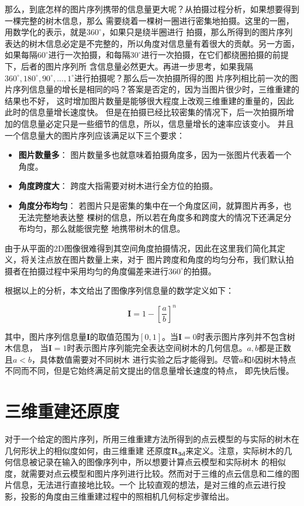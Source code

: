 那么，到底怎样的图片序列携带的信息量更大呢？从拍摄过程分析，如果想要得到一棵完整的树木信息，那么
需要绕着一棵树一圈进行密集地拍摄。这里的一圈，用数学化的表示，就是$360^\circ$，如果只是绕半圈进行
拍摄，那么所得到的图片序列表达的树木信息必定是不完整的，所以角度对信息量有着很大的贡献。另一方面，
如果每隔$60^\circ$进行一次拍摄，和每隔$30^\circ$进行一次拍摄，在它们都绕圈拍摄的前提下，后者的图片序列所
含信息量必然更大。再进一步思考，如果我隔$360^\circ,180^\circ,90^\circ,..., 1^\circ$进行拍摄呢？那么后一次拍摄所得的图
片序列相比前一次的图片序列信息量的增长是相同的吗？答案是否定的，因为当图片很少时，三维重建的结果也不好，
这时增加图片数量是能够很大程度上改观三维重建的重量的，因此此时的信息量增长速度快。
但是在拍摄已经比较密集的情况下，后一次拍摄所增加的信息量必定只是一些细节的信息，所以，信息量增长的速率应该变小。
并且一个信息量大的图片序列应该满足以下三个要求：\\
\begin{itemize}
	\item \textbf{图片数量多}： 图片数量多也就意味着拍摄角度多，因为一张图片代表着一个角度。
	\item \textbf{角度跨度大}： 跨度大指需要对树木进行全方位的拍摄。
	\item \textbf{角度分布均匀}： 若图片只是密集的集中在一个角度区间，就算图片再多，也无法完整地表达整
								  棵树的信息，所以若在角度多和跨度大的情况下还满足分布均匀，那么就能很完整
								  地携带树木的信息。
\end{itemize}

由于从平面的2D图像很难得到其空间角度拍摄情况，因此在这里我们简化其定义，将关注点放在图片数量上来，对于
图片跨度和角度的均匀分布，我们默认拍摄者在拍摄过程中采用均匀的角度偏差来进行$360^\circ$的拍摄。

根据以上的分析，本文给出了图像序列信息量的数学定义如下：\\
\begin{definition}
	\[ \mathbf{I}=1-\left[\frac{a}{b}\right]^n \]
\end{definition}

其中，图片序列信息量$\mathbf{I}$的取值范围为$[0,1]$。当$\mathbf{I}=0$时表示图片序列并不包含树木信息，
当$\mathbf{I}=1$时表示图片序列能完全表达空间树木的几何信息。$a,b$都是正数且$a<b$，具体数值需要对不同树木
进行实验之后才能得到。尽管$a$和$b$因树木特点不同而不同，但是它始终满足前文提出的信息量增长速度的特点，
即先快后慢。

\section{三维重建还原度}
对于一个给定的图片序列，所用三维重建方法所得到的点云模型的与实际的树木在几何形状上的相似度如何，由三维重建
还原度$\mathbf{R_{3d}}$来定义。注意，实际树木的几何信息被记录在输入的图像序列中，所以想要计算点云模型和实际树木
的相似度，就需要对点云模型和图片序列进行比较。然而对于三维的点云信息和二维的图片信息，无法进行直接地比较。一个
比较直观的想法，是对三维的点云进行投影，投影的角度由三维重建过程中的照相机几何标定步骤给出。

